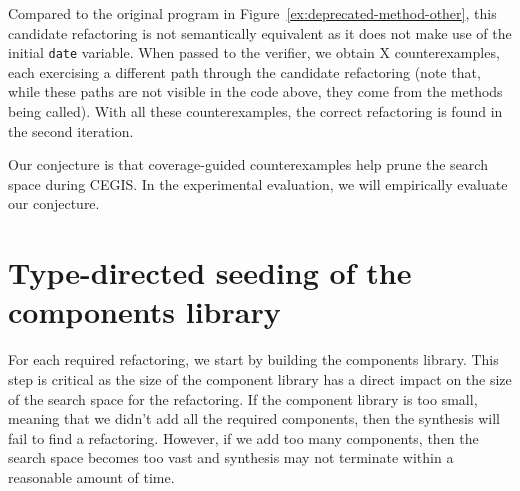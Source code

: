 \documentclass[runningheads,a4paper]{llncs}
\begin{document}
Compared to the original program in Figure~\ref{ex:deprecated-method-other}, this
candidate refactoring is not semantically equivalent as it does not make
use of the initial \texttt{date} variable. When passed to the verifier,
we obtain X counterexamples, each exercising a different path through the
candidate refactoring (note that, while these paths are not visible in the
code above, they come from the methods being called). With all these counterexamples,
the correct refactoring is found in the second iteration.

Our conjecture is that coverage-guided counterexamples help prune
the search space during CEGIS. In the experimental evaluation, we will
empirically evaluate our conjecture.



\section{{\bf Type-directed seeding of the components library}}\label{sec:components-seeding}
For each required refactoring, we start by building the components library.
This step is critical as the size of the component library has a direct impact
on the size of the search space for the refactoring.
If the component library is too small, meaning that we didn't add all
the required components, then the synthesis will fail to find a refactoring.
However, if we add too many components, then the search space becomes too vast and
synthesis may not terminate within a reasonable amount of time.
\end{document}
